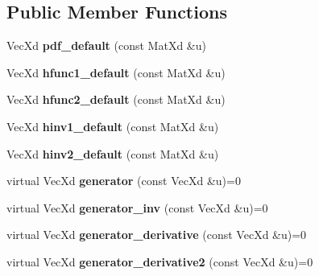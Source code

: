\subsection*{Public Member Functions}
\begin{DoxyCompactItemize}
\item 
Vec\+Xd {\bfseries pdf\+\_\+default} (const Mat\+Xd \&u)\hypertarget{class_archimedean_bicop_adee082ce9b2f7cc4a3408d67ed6b49f5}{}\label{class_archimedean_bicop_adee082ce9b2f7cc4a3408d67ed6b49f5}

\item 
Vec\+Xd {\bfseries hfunc1\+\_\+default} (const Mat\+Xd \&u)\hypertarget{class_archimedean_bicop_a912effaac24a1c94aa1e1d4b08819d75}{}\label{class_archimedean_bicop_a912effaac24a1c94aa1e1d4b08819d75}

\item 
Vec\+Xd {\bfseries hfunc2\+\_\+default} (const Mat\+Xd \&u)\hypertarget{class_archimedean_bicop_a1651e16c4534ca99cd58eaf8602b8525}{}\label{class_archimedean_bicop_a1651e16c4534ca99cd58eaf8602b8525}

\item 
Vec\+Xd {\bfseries hinv1\+\_\+default} (const Mat\+Xd \&u)\hypertarget{class_archimedean_bicop_a5c5a8569bad4be9e92ccd4434305806b}{}\label{class_archimedean_bicop_a5c5a8569bad4be9e92ccd4434305806b}

\item 
Vec\+Xd {\bfseries hinv2\+\_\+default} (const Mat\+Xd \&u)\hypertarget{class_archimedean_bicop_a6bac4cee0e824719b107477a06caf19e}{}\label{class_archimedean_bicop_a6bac4cee0e824719b107477a06caf19e}

\item 
virtual Vec\+Xd {\bfseries generator} (const Vec\+Xd \&u)=0\hypertarget{class_archimedean_bicop_a9b79997308dc154a23808b84a863c563}{}\label{class_archimedean_bicop_a9b79997308dc154a23808b84a863c563}

\item 
virtual Vec\+Xd {\bfseries generator\+\_\+inv} (const Vec\+Xd \&u)=0\hypertarget{class_archimedean_bicop_af12082f1046554e0121b2c7d93148f13}{}\label{class_archimedean_bicop_af12082f1046554e0121b2c7d93148f13}

\item 
virtual Vec\+Xd {\bfseries generator\+\_\+derivative} (const Vec\+Xd \&u)=0\hypertarget{class_archimedean_bicop_a9a18bbc021eb033c5b7d992d6d572b9b}{}\label{class_archimedean_bicop_a9a18bbc021eb033c5b7d992d6d572b9b}

\item 
virtual Vec\+Xd {\bfseries generator\+\_\+derivative2} (const Vec\+Xd \&u)=0\hypertarget{class_archimedean_bicop_a16d7c2474e7e9bd16fa60a02550762ed}{}\label{class_archimedean_bicop_a16d7c2474e7e9bd16fa60a02550762ed}


\end{DoxyCompactItemize}
